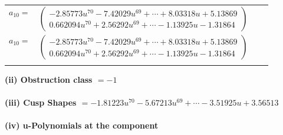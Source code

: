 \documentclass[1p]{elsarticle_modified}
\theoremstyle{definition}
\begin{document}
\begin{tabular}{m{7pt} m{180pt} m{7pt} m{180pt} }
\flushright $a_{10}=$&$\begin{pmatrix}-2.85773 u^{70}-7.42029 u^{69}+\cdots+8.03318 u+5.13869\\0.662094 u^{70}+2.56292 u^{69}+\cdots-1.13925 u-1.31864\end{pmatrix}$\\ \flushright $a_{10}=$&$\begin{pmatrix}-2.85773 u^{70}-7.42029 u^{69}+\cdots+8.03318 u+5.13869\\0.662094 u^{70}+2.56292 u^{69}+\cdots-1.13925 u-1.31864\end{pmatrix}$\\&\end{tabular}
\flushleft \textbf{(ii) Obstruction class $= -1$}\\~\\
\flushleft \textbf{(iii) Cusp Shapes $= -1.81223 u^{70}-5.67213 u^{69}+\cdots-3.51925 u+3.56513$}\\~\\
\newpage\renewcommand{\arraystretch}{1}
\flushleft \textbf{(iv) u-Polynomials at the component}\newline \\
\end{document}
